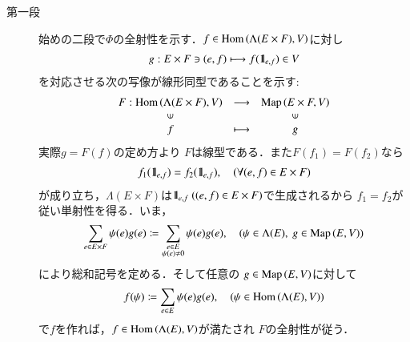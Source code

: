 	\begin{prf}\mbox{}
		\begin{description}
			\item[第一段]
				始めの二段で$\Phi$の全射性を示す．$f \in \mathrm{Hom} \left(\Lambda(E \times F),V\right)$に対し
				\begin{align}
					g: E \times F \ni (e,f) \longmapsto f(\mbox{1}\hspace{-0.25em}\mbox{l}_{e,f}) \in V
				\end{align}
				を対応させる次の写像が線形同型であることを示す:
				\begin{align}
					\begin{array}{ccc}
						F:\Hom{\Lambda(E \times F)}{V} & \longrightarrow & \Map{E \times F}{V} \\
						\rotatebox{90}{$\in$} & & \rotatebox{90}{$\in$} \\
						f & \longmapsto & g
					\end{array}
				\end{align}
				実際$g = F(f)$の定め方より
				$F$は線型である．また$F(f_1) = F(f_2)$なら
				\begin{align}
					f_1(\mbox{1}\hspace{-0.25em}\mbox{l}_{e,f}) = f_2(\mbox{1}\hspace{-0.25em}\mbox{l}_{e,f}),
					\quad (\forall (e,f) \in E \times F)
				\end{align}
				が成り立ち，$\Lambda(E \times F)$は$\mbox{1}\hspace{-0.25em}\mbox{l}_{e,f}\ ((e,f) \in E \times F)$で生成されるから
				$f_1 = f_2$が従い単射性を得る．いま，
				\begin{align}
					\sum_{e \in E \times F} \psi(e) g(e)
					\coloneqq \sum_{\substack{e \in E \\ \psi(e) \neq 0}} \psi(e) g(e),
					\quad (\psi \in \Lambda(E),\ g \in \mathrm{Map} \left(E,V\right))
				\end{align}
				により総和記号を定める．そして任意の
				$g \in \mathrm{Map} \left(E,V\right)$に対して
				\begin{align}
					f(\psi) \coloneqq \sum_{e \in E} \psi(e) g(e),
					\quad (\psi \in \mathrm{Hom} \left(\Lambda(E),V\right))
				\end{align}
				で$f$を作れば，$f \in \mathrm{Hom} \left(\Lambda(E),V\right)$が満たされ
				$F$の全射性が従う．
				

\end{description}
\end{prf}
